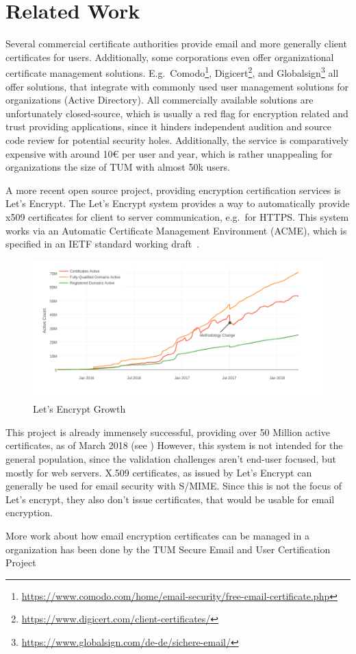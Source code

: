\chapter{Related Work}\label{ch:relatedWork}
Several commercial certificate authorities provide email and more generally client certificates for users.
Additionally, some corporations even offer organizational certificate management solutions.
E.g.\ Comodo\footnote{\url{https://www.comodo.com/home/email-security/free-email-certificate.php}},
Digicert\footnote{\url{https://www.digicert.com/client-certificates/}}, and
Globalsign\footnote{\url{https://www.globalsign.com/de-de/sichere-email/}} all offer solutions, that integrate with
commonly used user management solutions for organizations (Active Directory).
All commercially available solutions are unfortunately closed-source, which is usually a red flag for encryption related
and trust providing applications, since it hinders independent audition and source code review for potential security
holes.
Additionally, the service is comparatively expensive with around 10€ per user and year, which is rather unappealing for
organizations the size of TUM with almost 50k users.

A more recent open source project, providing encryption certification services is Let's Encrypt.
The Let's Encrypt system provides a way to automatically provide x509 certificates for client to server communication,
e.g.\ for HTTPS\@.
This system works via an Automatic Certificate Management Environment (ACME), which is specified in an IETF standard
working draft~\cite{letsencrypteacme}.

\begin{figure}[hb]
    \centering
    \includegraphics[width=.675\textwidth]{figures/letsencryptusers.png}
    \caption{Let's Encrypt Growth~\cite{letsencryptstats}}
    \label{fig:letsencrypt}
\end{figure}

This project is already immensely successful, providing over 50 Million active certificates, as of March 2018 (see
)
However, this system is not intended for the general population, since the validation challenges aren't end-user
focused, but mostly for web servers.
X.509 certificates, as issued by Let's Encrypt can generally be used for email security with S/MIME\@.
Since this is not the focus of Let's encrypt, they also don't issue certificates, that would be usable for email
encryption.

More work about how email encryption certificates can be managed in a organization has been done by the TUM Secure
Email and User Certification
Project~\cite{hauner2016interoperability, jagdish2016certservice, straub2016directoryservice, maier2015multidevice}
